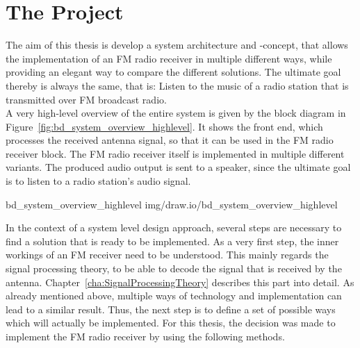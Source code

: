 \section{The Project}

The aim of this thesis is develop a system architecture and -concept, that allows the implementation of an FM radio receiver in multiple different ways, while providing an elegant way to compare the different solutions.
The ultimate goal thereby is always the same, that is: Listen to the music of a radio station that is transmitted over FM broadcast radio.\\

A very high-level overview of the entire system is given by the block diagram in Figure~\ref{fig:bd_system_overview_highlevel}.
It shows the front end, which processes the received antenna signal, so that it can be used in the FM radio receiver block.
The FM radio receiver itself is implemented in multiple different variants.
The produced audio output is sent to a speaker, since the ultimate goal is to listen to a radio station's audio signal.

 {bd_system_overview_highlevel} {img/draw.io/bd_system_overview_highlevel}

In the context of a system level design approach, several steps are necessary to find a solution that is ready to be implemented.
As a very first step, the inner workings of an FM receiver need to be understood.
This mainly regards the signal processing theory, to be able to decode the signal that is received by the antenna.
Chapter~\ref{cha:SignalProcessingTheory} describes this part into detail.
As already mentioned above, multiple ways of technology and implementation can lead to a similar result.
Thus, the next step is to define a set of possible ways which will actually be implemented.
For this thesis, the decision was made to implement the FM radio receiver by using the following methods.\\

